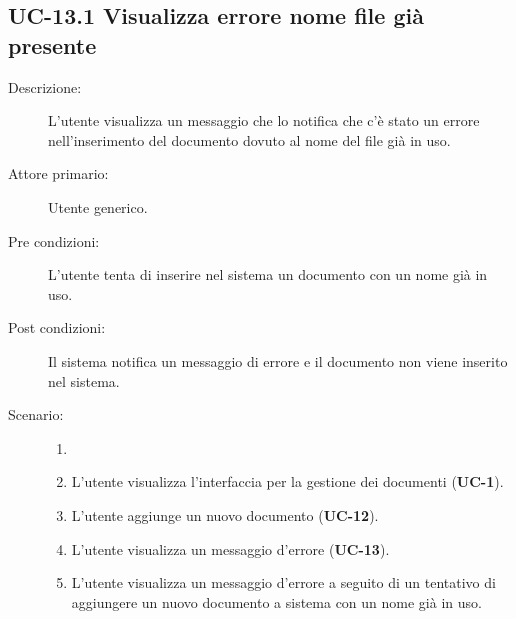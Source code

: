 \subsection{UC-13.1 Visualizza errore nome file già presente}
\begin{description}
    \item[Descrizione:] L'utente visualizza un messaggio che lo notifica che c'è stato un errore nell'inserimento del documento dovuto al nome del file già in uso.
    \item[Attore primario:] Utente generico.
    \item[Pre condizioni:] L'utente tenta di inserire nel sistema un documento con un nome già in uso.
    \item[Post condizioni:] Il sistema notifica un messaggio di errore e il documento non viene inserito nel sistema.
    \item[Scenario:]
    \begin{enumerate}
        \item[] 
        \item L’utente visualizza l'interfaccia per la gestione dei documenti (\textbf{UC-1}).
        \item L’utente aggiunge un nuovo documento (\textbf{UC-12}).
        \item L'utente visualizza un messaggio d'errore (\textbf{UC-13}).
        \item L'utente visualizza un messaggio d'errore a seguito di un tentativo di aggiungere un nuovo documento a sistema con un nome già in uso.
    \end{enumerate}
\end{description}


